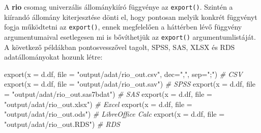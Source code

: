 \documentclass[
]{book}
\newenvironment{Shaded}{\begin{snugshade}}{\end{snugshade}}
\newcommand{\AttributeTok}[1]{\textcolor[rgb]{0.77,0.63,0.00}{#1}}
\newcommand{\CommentTok}[1]{\textcolor[rgb]{0.56,0.35,0.01}{\textit{#1}}}
\newcommand{\FunctionTok}[1]{\textcolor[rgb]{0.00,0.00,0.00}{#1}}
\newcommand{\NormalTok}[1]{#1}
\newcommand{\OtherTok}[1]{\textcolor[rgb]{0.56,0.35,0.01}{#1}}
\newcommand{\StringTok}[1]{\textcolor[rgb]{0.31,0.60,0.02}{#1}}
\begin{document}
\begin{Shaded}
\end{Shaded}

A \textbf{rio} csomag univerzális állománykiíró függvénye az \texttt{export()}. Szintén a kiírandó állomány kiterjesztése dönti el, hogy pontosan melyik konkrét függvényt fogja működtetni az \texttt{export()}, ennek megfelelően a háttérben lévő függvény argumentumaival esetlegesen mi is bővíthetjük az \texttt{export()} argumentumlistáját. A következő példákban pontosvesszővel tagolt, SPSS, SAS, XLSX és RDS adatállományokat hozunk létre:

\begin{Shaded}
\begin{Highlighting}[]
\FunctionTok{export}\NormalTok{(}\AttributeTok{x =}\NormalTok{ d.df, }\AttributeTok{file =} \StringTok{"output/adat/rio\_out.csv"}\NormalTok{, }\AttributeTok{dec=}\StringTok{","}\NormalTok{, }\AttributeTok{sep=}\StringTok{";"}\NormalTok{) }\CommentTok{\# CSV}
\FunctionTok{export}\NormalTok{(}\AttributeTok{x =}\NormalTok{ d.df, }\AttributeTok{file =} \StringTok{"output/adat/rio\_out.sav"}\NormalTok{)                  }\CommentTok{\# SPSS}
\FunctionTok{export}\NormalTok{(}\AttributeTok{x =}\NormalTok{ d.df, }\AttributeTok{file =} \StringTok{"output/adat/rio\_out.sas7bdat"}\NormalTok{)              }\CommentTok{\# SAS}
\FunctionTok{export}\NormalTok{(}\AttributeTok{x =}\NormalTok{ d.df, }\AttributeTok{file =} \StringTok{"output/adat/rio\_out.xlsx"}\NormalTok{)                }\CommentTok{\# Excel   }
\FunctionTok{export}\NormalTok{(}\AttributeTok{x =}\NormalTok{ d.df, }\AttributeTok{file =} \StringTok{"output/adat/rio\_out.ods"}\NormalTok{)      }\CommentTok{\# LibreOffice Calc}
\FunctionTok{export}\NormalTok{(}\AttributeTok{x =}\NormalTok{ d.df, }\AttributeTok{file =} \StringTok{"output/adat/rio\_out.RDS"}\NormalTok{)                   }\CommentTok{\# RDS}
\end{Highlighting}
\end{Shaded}
\end{document}
